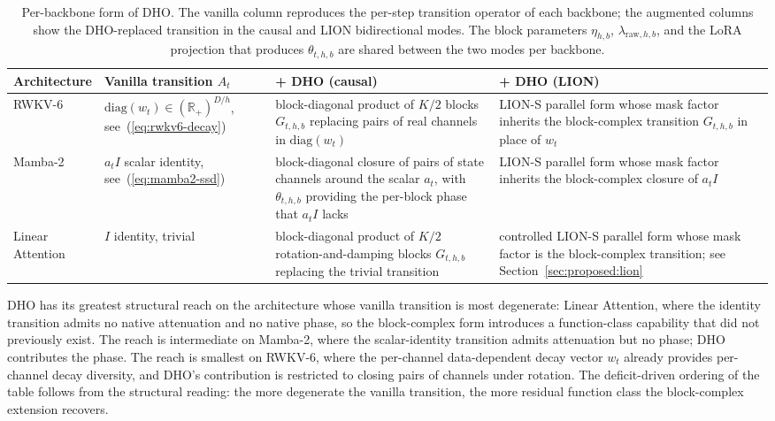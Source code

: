 \begin{table}[t]
\centering
\small
\caption[Per-backbone form of the Damped Harmonic
Oscillator]{Per-backbone form of DHO. The vanilla column
reproduces the per-step transition operator of each backbone; the
augmented columns show the DHO-replaced transition in the causal
and LION bidirectional modes. The block parameters $\eta_{h, b}$,
$\lambda_{\mathrm{raw}, h, b}$, and the LoRA projection that
produces $\theta_{t, h, b}$ are shared between the two modes per
backbone.}
\label{tab:dho-deployment}
\setlength{\tabcolsep}{4pt}
\renewcommand{\arraystretch}{1.25}
\begin{tabularx}{\linewidth}{@{}p{2.4cm} X X X@{}}
\toprule
\textbf{Architecture} & \textbf{Vanilla transition $A_{t}$} & \textbf{+ DHO (causal)} & \textbf{+ DHO (LION)} \\
\midrule
RWKV-6 &
$\mathrm{diag}(w_{t}) \in (\mathbb{R}_{+})^{D/h}$, see~(\ref{eq:rwkv6-decay}) &
block-diagonal product of $K/2$ blocks $G_{t, h, b}$ replacing pairs of real channels in $\mathrm{diag}(w_{t})$ &
LION-S parallel form whose mask factor inherits the block-complex transition $G_{t, h, b}$ in place of $w_{t}$ \\
\addlinespace
Mamba-2 &
$a_{t} I$ scalar identity, see~(\ref{eq:mamba2-ssd}) &
block-diagonal closure of pairs of state channels around the scalar $a_{t}$, with $\theta_{t, h, b}$ providing the per-block phase that $a_{t} I$ lacks &
LION-S parallel form whose mask factor inherits the block-complex closure of $a_{t} I$ \\
\addlinespace
\shortstack[l]{Linear\\Attention} &
$I$ identity, trivial &
block-diagonal product of $K/2$ rotation-and-damping blocks $G_{t, h, b}$ replacing the trivial transition &
controlled LION-S parallel form whose mask factor is the block-complex transition; see Section~\ref{sec:proposed:lion} \\
\bottomrule
\end{tabularx}
\end{table}

DHO has its greatest structural reach on the architecture whose
vanilla transition is most degenerate: Linear Attention, where the
identity transition admits no native attenuation and no native
phase, so the block-complex form introduces a function-class
capability that did not previously exist. The reach is intermediate
on Mamba-2, where the scalar-identity transition admits attenuation
but no phase; DHO contributes the phase. The reach is smallest on
RWKV-6, where the per-channel data-dependent decay vector $w_{t}$
already provides per-channel decay diversity, and DHO's contribution
is restricted to closing pairs of channels under rotation. The
deficit-driven ordering of the table follows from the structural
reading: the more degenerate the vanilla transition, the more
residual function class the block-complex extension recovers.


